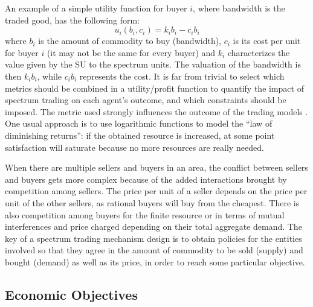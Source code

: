 An example of a simple utility function for buyer $i$, where bandwidth is the traded good, has the following form:
\begin{equation}
u_{i}(b_{i}, c_{i}) = k_{i}b_{i}-c_{i}b_{i}
\end{equation}
where $b_{i}$ is the amount of commodity to buy (bandwidth), $c_i$ is its cost per unit for buyer $i$ (it may not be the same for every buyer) and $k_{i}$ characterizes the value given by the SU to the spectrum units. The valuation of the bandwidth is then $k_{i}b_{i}$, while $c_{i}b_{i}$ represents the cost. It is far from trivial to select which metrics should be combined in a utility/profit function to quantify the impact of spectrum trading on each agent's outcome, and which constraints should be imposed. The metric used strongly influences the outcome of the trading models \cite{ref:YZhao2009}. One usual approach is to use logarithmic functions to model the ``law of diminishing returns'': if the obtained resource is increased, at some point satisfaction will saturate because no more resources are really needed.

When there are multiple sellers and buyers in an area,  the conflict between sellers and buyers gets more complex because of the added interactions brought by competition among sellers. The price per unit of a seller depends on the price per unit of the other sellers, as rational buyers will buy from the cheapest. There is also competition among buyers for the finite resource or in terms of mutual interferences and price charged depending on their total aggregate demand. The key of a spectrum trading mechanism design is to obtain policies for the entities involved so that they agree in the amount of commodity to be sold (supply) and bought (demand) as well as its price, in order to reach some particular objective. 

\subsection{Economic Objectives}
\label{subsec:Objective}	

